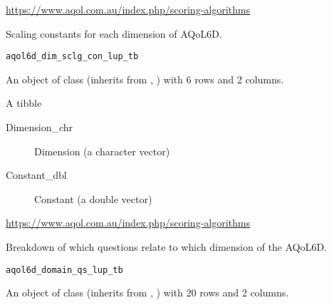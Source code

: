 \documentclass[a4paper]{book}
\begin{document}
%
\begin{Source}\relax
\url{https://www.aqol.com.au/index.php/scoring-algorithms}
\end{Source}
%
\begin{Description}\relax
Scaling constants for each dimension of AQoL6D.
\end{Description}
%
\begin{Usage}
\begin{verbatim}
aqol6d_dim_sclg_con_lup_tb
\end{verbatim}
\end{Usage}
%
\begin{Format}
An object of class  (inherits from , ) with 6 rows and 2 columns.
\end{Format}
%
\begin{Details}\relax
A tibble

\begin{description}

\item[Dimension\_chr] Dimension (a character vector)
\item[Constant\_dbl] Constant (a double vector)

\end{description}

\end{Details}
%
\begin{Source}\relax
\url{https://www.aqol.com.au/index.php/scoring-algorithms}
\end{Source}
%
\begin{Description}\relax
Breakdown of which questions relate to which dimension of the AQoL6D.
\end{Description}
%
\begin{Usage}
\begin{verbatim}
aqol6d_domain_qs_lup_tb
\end{verbatim}
\end{Usage}
%
\begin{Format}
An object of class  (inherits from , ) with 20 rows and 2 columns.
\end{Format}
\end{document}
